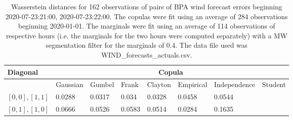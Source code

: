 \begin{table}[h] 
    \centering 
    \begin{tabular}{|l|l|l|l|l|l|l|l|} \hline 
        \textbf{Diagonal} & \multicolumn{7}{c|}{\textbf{Copula}} \\ \hline 
        & Gaussian & Gumbel & Frank & Clayton & Empirical & Independence & Student \\ \hline 
        $[0,0], [1,1]$ & 0.0288 & 0.0317 & 0.034 & 0.0328 & 0.0458 & 0.0544 &  \\ \hline 
        $[0,1], [1,0]$ & 0.0666 & 0.0526 & 0.0583 & 0.0514 & 0.0284 & 0.1635 &  \\ \hline 
    \end{tabular} 
    \caption{Wasserstein distances for 162 observations of pairs of BPA wind forecast errors beginning 2020-07-23:21:00, 2020-07-23:22:00. The copulas were fit  using an average of 284 observations beginning 2020-01-01. The marginals were fit using an average of 114 observations of respective hours (i.e. the  marginals for the two hours were computed separately) with a MW segmentation filter for the marginals of 0.4. The data file used was WIND\_forecasts\_actuals.csv.} 
\end{table}